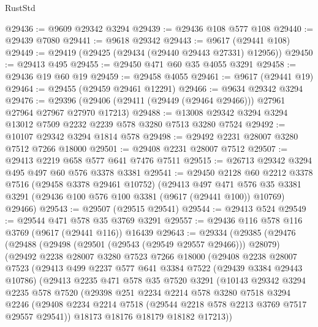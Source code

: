 \begin{lexlean}{RustStd}
\begin{coremodule}
@29436 := @9609 @29342 @3294
@29439 := @29436 @108 @577 @108
@29440 := @29439 @7080
@29441 := @9618 @29342
@29443 := @9617 (@29441 @108)
@29449 := @29419 (@29425 (@29434 (@29440 @29443 @27331) @12956))
@29450 := @29413 @495
@29455 := @29450 @471 @60 @35 @4055 @3291
@29458 := @29436 @19 @60 @19
@29459 := @29458 @4055
@29461 := @9617 (@29441 @19)
@29464 := @29455 (@29459 @29461 @12291)
@29466 := @9634 @29342 @3294
@29476 := @29396 (@29406 (@29411 (@29449 (@29464 @29466))) @27961 @27964 @27967 @27970 @17213)
@29488 := @13008 @29342 @3294 @3294 @13012 @7509 @2232 @2239 @578 @3280 @7513 @3280 @7524
@29492 := @10107 @29342 @3294 @1814 @578
@29498 := @29492 @2231 @28007 @3280 @7512 @7266 @18000
@29501 := @29408 @2231 @28007 @7512
@29507 := @29413 @2219 @658 @577 @641 @7476 @7511
@29515 := @26713 @29342 @3294 @495 @497 @60 @576 @3378 @3381
@29541 := @29450
    @2128
    @60
    @2212
    @3378
    @7516
    (@29458 @3378 @29461 @10752)
    (@29413
      @497
      @471
      @576
      @35
      @3381
      @3291
      (@29436 @100 @576 @100 @3381 (@9617 (@29441 @100)) @10769)
      @29466)
@29543 := @29507 (@29515 @29541)
@29544 := @29413 @524
@29549 := @29544 @471 @578 @35 @3769 @3291
@29557 := @29436 @116 @578 @116 @3769 (@9617 (@29441 @116)) @16439
@29643 := @29334
    (@29385
      (@29476
        (@29488
          (@29498 (@29501 (@29543 (@29549 @29557 @29466))) @28079)
          (@29492
            @2238
            @28007
            @3280
            @7523
            @7266
            @18000
            (@29408
              @2238
              @28007
              @7523
              (@29413
                @499
                @2237
                @577
                @641
                @3384
                @7522
                (@29439 @3384 @29443 @10786)
                (@29413
                  @2235
                  @471
                  @578
                  @35
                  @7520
                  @3291
                  (@10143
                    @29342
                    @3294
                    @2235
                    @578
                    @7520
                    (@29398
                      @251
                      @2234
                      @2214
                      @578
                      @3280
                      @7518
                      @3294
                      @2246
                      (@29408 @2234 @2214 @7518 (@29544 @2218 @578 @2213 @3769 @7517 @29557 @29541))
                      @18173
                      @18176
                      @18179
                      @18182
                      @17213))

\end{coremodule}
\end{lexlean}
